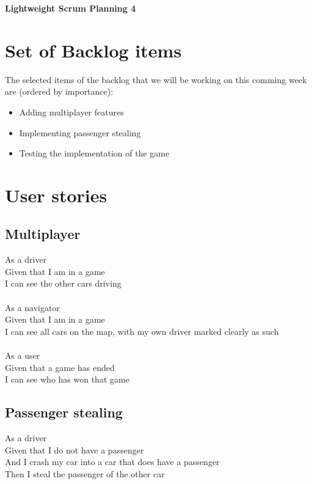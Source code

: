 \documentclass{article}
\begin{document}
\begin{minipage}[H]{\textwidth}
\vspace{0.3cm}
		\begin{center}
		\vspace{0.3cm}
			\Huge{\textbf{Lightweight Scrum Planning 4}}\\
		\vspace{0.3cm}	
		\vspace{0.7cm}		
		\end{center}
	\end{minipage}

\section*{Set of Backlog items}
The selected items of the backlog that we will be working on this comming week  are (ordered by importance):
\begin{itemize}
	\item Adding multiplayer features
	\item Implementing passenger stealing
	\item Testing the implementation of the game
\end{itemize}

\section*{User stories}
\subsection*{Multiplayer}
As a driver\\
Given that I am in a game\\
I can see the other cars driving\\\\
As a navigator\\
Given that I am in a game\\
I can see all cars on the map, with my own driver marked clearly as such\\\\
As a user\\
Given that a game has ended\\
I can see who has won that game
\subsection*{Passenger stealing}
As a driver\\
Given that I do not have a passenger\\
And I crash my car into a car that does have a passenger\\
Then I steal the passenger of the other car\\\\
\end{document}
